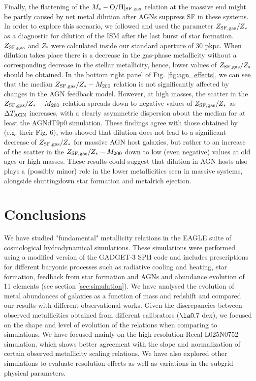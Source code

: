 \documentclass[useAMS,usenatbib]{mn2e}
\begin{document}
Finally, the flattening of the
$M_* - {\rm O/H}|_{\rm SF,gas}$ relation at the massive end might be partly caused
by net metal dilution after AGNs suppress SF in these systems.
In order to explore this scenario, we followed \citet{yates2014} and
used the parameter $Z_{\rm SF,gas} / Z_*$ as a diagnostic for
dilution of the ISM after the last burst of star formation. 
$Z_{\rm SF,gas}$ and $Z_*$ were calculated inside our standard aperture of 30 pkpc.
When dilution takes place there
is a decrease in the gas-phase metallicity
without a corresponding decrease in the stellar metallicity, hence, lower values
of $Z_{\rm SF,gas} / Z_*$ should be obtained.
In the bottom right panel of Fig. \ref{fig:agn_effects}, we can see that the
median $Z_{\rm SF,gas} / Z_* - M_{200}$ relation is not significantly affected by changes in
the AGN feedback model.
However, at high masses, the scatter in the $Z_{\rm SF,gas} / Z_* - M_{200}$ relation 
spreads down to negative values of $Z_{\rm SF,gas} / Z_*$ as 
 $\Delta T_{\rm AGN}$ increases,  with a clearly asymmetric dispersion about the median for at least the AGNdT9p0 simulation.
These findings agree with those obtained by \citet{yates2014} (e.g. their Fig. 6), who showed that
dilution does not lead to a significant decrease of $Z_{\rm SF,gas} / Z_*$ for massive AGN host galaxies,
but rather to an increase of the scatter in the $Z_{\rm SF,gas} / Z_* - M_{200}$ down to low (even negative) 
values at old ages or high masses.
These results could suggest that dilution in AGN hosts also plays a (possibly
minor) role in the lower metallicities seen in massive systems, alongside shutting­down star formation and metal­rich
ejection.


\section{Conclusions}
\label{sec:conclusions}

We have studied "fundamental" metallicity relations in the 
{\sc EAGLE} suite of cosmological hydrodynamical simulations. 
These simulations were performed using a modified version of the {\sc GADGET}-3
SPH code and includes prescriptions for different baryonic processes such as
radiative cooling and heating, star formation, feedback from star formation and AGNs
and abundance evolution of 11 elements (see section \ref{sec:simulation}).
We have analysed the evolution
of metal abundances of galaxies as a function of mass and redshift and
compared our results with different observational works.
Given the 
discrepancies between observed metallicities obtained from different calibrators 
($\la 0.7$ dex), we focused on the shape and level of evolution of the relations
when comparing to simulations.
We have focused mainly on the high-resolution Recal-L025N0752 simulation, which
shows better agreement with the slope and normalization of certain 
observed metallicity scaling relations.
We have also explored other simulations to evaluate resolution effects as
well as variations in the subgrid physical parameters.
\end{document}
